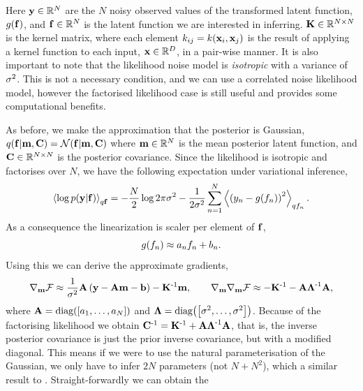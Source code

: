 \documentclass{article} %
\begin{document}
Here $\obs \in \real{N}$ are the $N$ noisy observed values of the transformed
latent function, $\nonlin{\lstate}$, and $\lstate \in \real{N}$ is the latent
function we are interested in inferring. $\KERNL \in \real{N\times N}$ is the
kernel matrix, where each element $\kernl_{ij} = \kernl\!\brac{\inobs_i,
    \inobs_j}$ is the result of applying a kernel function to each input,
$\inobs \in \real{D}$, in a pair-wise manner. It is also important to note that
the likelihood noise model is \emph{isotropic} with a variance of $\lvar$. This
is not a necessary condition, and we can use a correlated noise likelihood
model, however the factorised likelihood case is still useful and provides some
computational benefits. 
    
As before, we make the approximation that the posterior is Gaussian,
$\qrobC{\lstate}{\pomean, \pocov} = \gausC{\lstate}{\pomean, \pocov}$ where
$\pomean \in \real{N}$ is the mean posterior latent function, and $\pocov \in
\real{N \times N}$ is the posterior covariance. Since the likelihood is
isotropic and factorises over $N$, we have the following expectation under
variational inference,
\begin{equation*}
    \expec{q\lstate}{\log\probC{\obs}{\lstate}} =
        - \frac{N}{2}\log{2\pi\lvar}
        - \frac{1}{2\lvar} \sum_{n=1}^N 
            \expec{q\lstates_n}{\brac{\obss_n - \nonlin{\lstates_n}}^2}.
\end{equation*}
As a consequence the linearization is scaler per element of $\lstate$,
\begin{equation}
    \nonlin{\lstates_n} \approx \Lins_n\lstates_n + \intcpts_n.
\end{equation}
Using this we can derive the approximate gradients,
\begin{equation}
    \nabla_\pomean\Fengy \approx \frac{1}{\lvar}\Linmat\brac{\obs -
        \Linmat\pomean - \intcpt} - \KERNL\inv\pomean,
    \qquad
    \nabla_\pomean\nabla_\pomean \Fengy \approx -\KERNL\inv
    -\Linmat\Lvar\inv\Linmat,
\end{equation}
where $\Linmat = \diag{\sbrac{\Lins_1, \ldots, \Lins_N}}$ and $\Lvar =
\diag{\sbrac{\lvar, \ldots, \lvar}}$. Because of the factorising likelihood we
obtain $\pocov\inv = \KERNL\inv + \Linmat\Lvar\inv\Linmat$, that is, the
inverse posterior covariance is just the prior inverse covariance, but with a
modified diagonal. This means if we were to use the natural parameterisation of
the Gaussian, we only have to infer $2N$ parameters (not $N + N^2$), which a
similar result to \cite{Opper2009}.  Straight-forwardly we can obtain the
\end{document}
